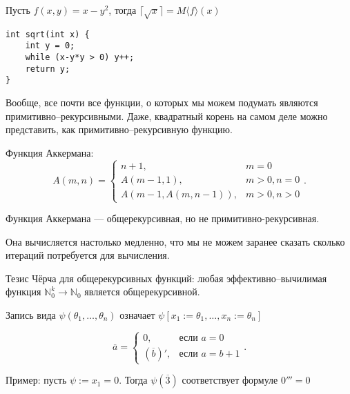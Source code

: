 \begin{example}
Пусть $f(x,y) = x-y^2$, тогда $\lceil\sqrt{x}\rceil = M\langle f\rangle (x)$

\begin{verbatim}
int sqrt(int x) {
    int y = 0;
    while (x-y*y > 0) y++;
    return y;
}
\end{verbatim}
\end{example}

Вообще, все почти все функции, о которых мы можем подумать являются примитивно--ре\-ку\-рсив\-ны\-ми. Даже, квадратный корень на самом деле можно представить, как примитивно--рекурсивную функцию.

\begin{definition}
Функция Аккермана:
\[ A(m,n) = \left\{\begin{array}{ll}
  n+1,&m = 0\\
  A(m-1,1),&m > 0, n = 0\\
  A(m-1,A(m,n-1)),&m > 0, n > 0
\end{array}\right. .\]
\end{definition}

\begin{theorem}
Функция Аккермана --- общерекурсивная, но не примитивно-рекурсивная.

Она вычисляется настолько медленно, что мы не можем заранее сказать сколько итераций потребуется для вычисления.
\end{theorem}

\begin{definition}
Тезис Чёрча для общерекурсивных функций: любая эффективно--вы\-чи\-ли\-мая
функция $\mathbb{N}^k_0\to\mathbb{N}_0$ является общерекурсивной.
\end{definition}

\begin{definition}
Запись вида $\psi(\theta_1,\dots,\theta_n)$ означает
$\psi[x_1:=\theta_1,\dots,x_n:=\theta_n]$
\end{definition}

\begin{definition}
\[ \overline{a} = \left\{\begin{array}{ll} 0, &\mbox{если } a = 0\\
 (\overline{b})', &\mbox{если } a = b+1
\end{array}\right. .\]
\end{definition}

Пример: пусть $\psi := x_1 = 0$.  Тогда $\psi(\overline{3})$ соответствует формуле $0''' = 0$

